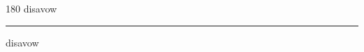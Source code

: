 
\begin{frame}
\begin{center}
\begin{turn}{180}
{\fontsize{2.5cm}{1em}\selectfont disavow}
\end{turn}
\vspace{1em}\par  
\hrule
\vspace{1em}\par  
{\fontsize{2.5cm}{1em}\selectfont disavow}
\end{center}
\end{frame}

